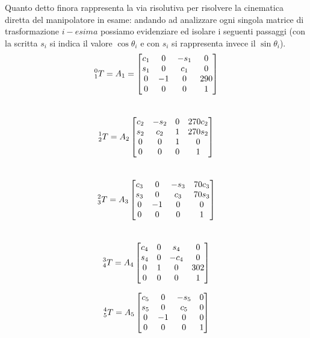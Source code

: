 Quanto detto finora rappresenta la via risolutiva per risolvere la cinematica diretta del manipolatore in esame: andando ad analizzare ogni singola matrice di trasformazione $i-esima$ possiamo evidenziare ed isolare i seguenti passaggi (con la scritta $s_i$ si indica il valore $\cos \theta_{i}$ e con $s_i$ si rappresenta invece il $\sin\theta_{i}$). 
\begin{equation*}
	\prescript{0}{1}{T}	= A_1 =
	\begin{bmatrix}
		c_1 & 0    &-s_1& 0\\
		s_1 & 0    &c_1 & 0\\
		0   & -1   & 0  & 290\\
		0   & 0    &  0 & 1
	\end{bmatrix}
\end{equation*}\\

\begin{equation*}
	\prescript{1}{2}{T}	= A_2
	\begin{bmatrix}
		c_2 &-s_2 &  0 & 270c_2\\
		s_2 & c_2 &  1 & 270s_2\\
		0   & 0   &  1 & 0\\
		0   & 0   &  0 & 1
	\end{bmatrix}
\end{equation*}\\

\begin{equation*}
	\prescript{2}{3}{T}	= A_3
	\begin{bmatrix}
		c_3 & 0    &-s_3& 70c_3\\
		s_3 & 0    & c_3& 70s_3\\
		0   & -1   & 0  & 0\\
		0   & 0    & 0 & 1
	\end{bmatrix}
\end{equation*}\\

\begin{equation*}
	\prescript{3}{4}{T}	= A_4
	\begin{bmatrix}
		c_4 & 0    &s_4 & 0\\
		s_4 & 0    &-c_4& 0\\
		0   & 1    & 0  & 302\\
		0   & 0    & 0  & 1
	\end{bmatrix}
\end{equation*}

\begin{equation*}
	\prescript{4}{5}{T}	= A_5
	\begin{bmatrix}
		c_5 & 0    &-s_5& 0\\
		s_5 & 0    &c_5 & 0\\
		0   & -1   & 0  & 0\\
		0   & 0    & 0  & 1
	\end{bmatrix}
\end{equation*}

